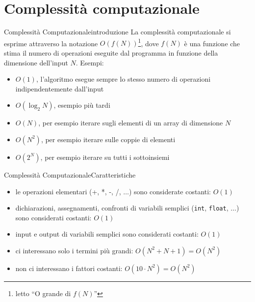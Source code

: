 \documentclass{beamer}
\begin{document}
\section{Complessit\`a computazionale}
\begin{frame}{Complessit\`a Computazionale}{introduzione}
    La complessit\`a computazionale si esprime attraverso la notazione $O(f(N))$\footnote{letto ``O grande di $f(N)$''}, dove $f(N)$ \`e una funzione
    che stima il numero di operazioni eseguite dal programma in funzione della dimensione dell'input $N$.
    \pause
    \vfill
    Esempi:
    \begin{itemize}
        \item $O(1)$, l'algoritmo esegue sempre lo stesso numero di operazioni indipendentemente dall'input
        \pause
        \item $O(\log_2 N)$, esempio più tardi
        \pause
        \item $O(N)$, per esempio iterare sugli elementi di un array di dimensione $N$
        \pause
        \item $O(N^2)$, per esempio iterare sulle coppie di elementi
        \pause
        \item $O(2^N)$, per esempio iterare su tutti i sottoinsiemi
    \end{itemize}
\end{frame}

\begin{frame}{Complessit\`a Computazionale}{Caratteristiche}
    \begin{itemize}
        \item le operazioni elementari (+, *, -, /, $\dots$) sono considerate costanti: $O(1)$
        \pause
    \item dichiarazioni, assegnamenti, confronti di variabili semplici (\texttt{int}, \texttt{float}, $\dots$) sono considerati costanti: $O(1)$
        \pause
        \item input e output di variabili semplici sono considerati costanti: $O(1)$
        \pause
        \item ci interessano solo i termini pi\`u grandi: $O(N^2 + N + 1) = O(N^2)$
        \pause
        \item non ci interessano i fattori costanti: $O(10 \cdot N^2) = O(N^2)$
    \end{itemize}
\end{frame}
\end{document}
